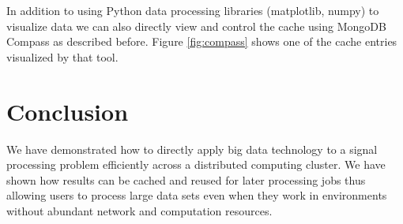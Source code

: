 \documentclass[conference,twoside]{IEEEtran}
\begin{document}
In addition to using Python data processing libraries (matplotlib, numpy) to visualize data we can also directly view and control the cache using MongoDB Compass\cite{mongodbcompass} as described before. Figure \ref{fig:compass} shows one of the cache entries visualized by that tool.

\section{Conclusion}
We have demonstrated how to directly apply big data technology to a signal processing problem efficiently across a distributed computing cluster. We have shown how results can be cached and reused for later processing jobs thus allowing users to process large data sets even when they work in environments without abundant network and computation resources.




%
\end{document}
